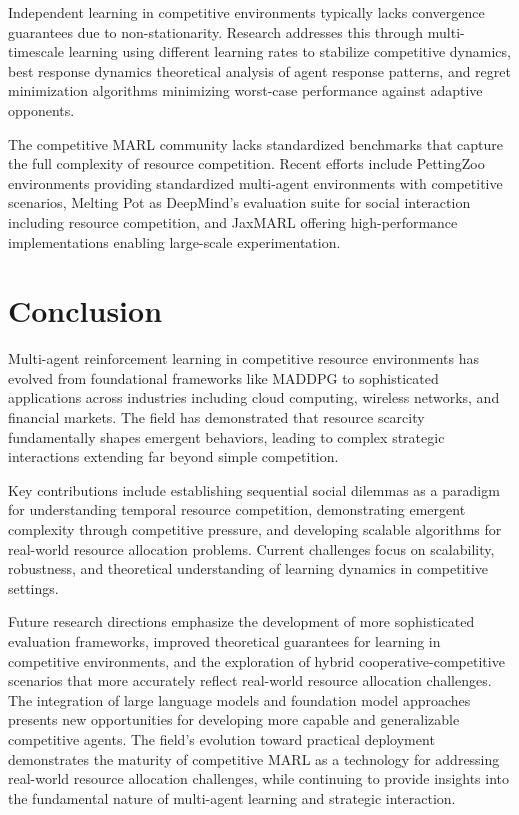 Independent learning in competitive environments typically lacks convergence guarantees due to non-stationarity. Research addresses this through multi-timescale learning using different learning rates to stabilize competitive dynamics, best response dynamics theoretical analysis of agent response patterns, and regret minimization algorithms minimizing worst-case performance against adaptive opponents.

The competitive MARL community lacks standardized benchmarks that capture the full complexity of resource competition. Recent efforts include PettingZoo environments providing standardized multi-agent environments with competitive scenarios, Melting Pot as DeepMind's evaluation suite for social interaction including resource competition, and JaxMARL offering high-performance implementations enabling large-scale experimentation.

\section{Conclusion}

Multi-agent reinforcement learning in competitive resource environments has evolved from foundational frameworks like MADDPG to sophisticated applications across industries including cloud computing, wireless networks, and financial markets. The field has demonstrated that resource scarcity fundamentally shapes emergent behaviors, leading to complex strategic interactions extending far beyond simple competition.

Key contributions include establishing sequential social dilemmas as a paradigm for understanding temporal resource competition, demonstrating emergent complexity through competitive pressure, and developing scalable algorithms for real-world resource allocation problems. Current challenges focus on scalability, robustness, and theoretical understanding of learning dynamics in competitive settings.

Future research directions emphasize the development of more sophisticated evaluation frameworks, improved theoretical guarantees for learning in competitive environments, and the exploration of hybrid cooperative-competitive scenarios that more accurately reflect real-world resource allocation challenges. The integration of large language models and foundation model approaches presents new opportunities for developing more capable and generalizable competitive agents. The field's evolution toward practical deployment demonstrates the maturity of competitive MARL as a technology for addressing real-world resource allocation challenges, while continuing to provide insights into the fundamental nature of multi-agent learning and strategic interaction.